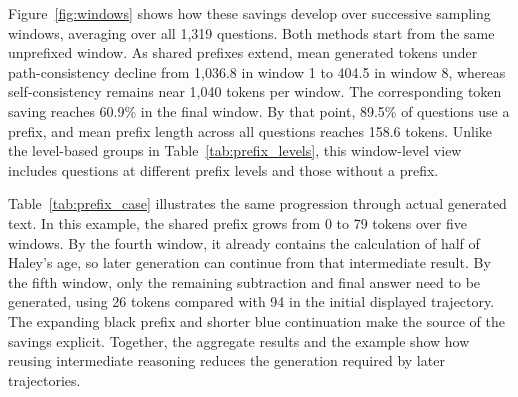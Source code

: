 Figure~\ref{fig:windows} shows how these savings develop over successive sampling windows, averaging over all 1,319 questions. Both methods start from the same unprefixed window. As shared prefixes extend, mean generated tokens under path-consistency decline from 1,036.8 in window 1 to 404.5 in window 8, whereas self-consistency remains near 1,040 tokens per window. The corresponding token saving reaches 60.9\% in the final window. By that point, 89.5\% of questions use a prefix, and mean prefix length across all questions reaches 158.6 tokens. Unlike the level-based groups in Table~\ref{tab:prefix_levels}, this window-level view includes questions at different prefix levels and those without a prefix.

Table~\ref{tab:prefix_case} illustrates the same progression through actual generated text. In this example, the shared prefix grows from 0 to 79 tokens over five windows. By the fourth window, it already contains the calculation of half of Haley's age, so later generation can continue from that intermediate result. By the fifth window, only the remaining subtraction and final answer need to be generated, using 26 tokens compared with 94 in the initial displayed trajectory. The expanding black prefix and shorter blue continuation make the source of the savings explicit. Together, the aggregate results and the example show how reusing intermediate reasoning reduces the generation required by later trajectories.



